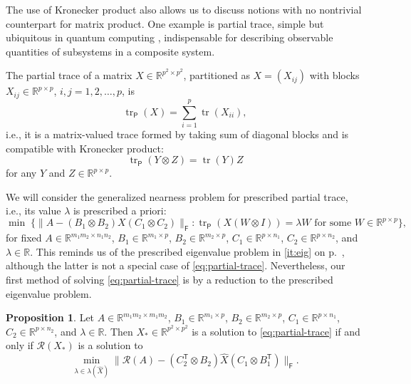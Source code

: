 \documentclass[11pt,reqno]{amsart}
\newcommand{\tp}{{\scriptscriptstyle\mathsf{T}}}
\newcommand{\F}{{\scriptscriptstyle\mathsf{F}}}
\newcommand{\Par}{{\scriptscriptstyle\mathsf{P}}}
\DeclareMathOperator{\tr}{tr}
\theoremstyle{definition}
\newtheorem{proposition}[theorem]{Proposition}
\numberwithin{equation}{section}
\newcommand{\R}{\mathbb{R}}
\begin{document}
The use of Kronecker product also allows us to discuss notions with no nontrivial counterpart for matrix product. One example is partial trace, simple but ubiquitous in quantum computing \cite{NielsenChuang}, indispensable for describing observable quantities of subsystems in a composite system.

The partial trace of a matrix $X \in \R^{p^2 \times p^2}$, partitioned as $X = (X_{ij})$ with blocks $X_{ij} \in \R^{p \times p}$, $i,j = 1,2,\dots,p$, is
\[
\tr_\Par(X) = \sum_{i=1}^{p} \tr(X_{ii}),
\]
i.e., it is a matrix-valued trace formed by taking sum of diagonal blocks and is compatible with Kronecker product:
\[
\tr_\Par(Y \otimes Z) = \tr(Y)Z
\]
for any $Y$ and $Z \in \R^{p \times p}$.

We will consider the generalized  nearness problem for prescribed partial trace, i.e., its value $\lambda$ is prescribed a priori:
\begin{equation}\label{eq:partial-trace}
    \min \; \{\lVert  A- (B_1 \otimes B_2)X(C_1 \otimes C_2)  \rVert_\F: \tr_\Par(X(W \otimes I)) = \lambda W \text{ for some } W \in \R^{p \times p}\},
\end{equation}
for fixed $A \in \R^{m_1m_2\times n_1n_2}$, $B_1 \in \R^{m_1 \times p}$, $B_2 \in \R^{m_2 \times p}$, $C_1 \in \R^{p \times n_1}$, $C_2 \in \R^{p \times n_2}$, and $\lambda \in \R$. This reminds us of the prescribed eigenvalue problem in \ref{it:eig} on p.~\pageref{it:eig}, although the latter is not a special case of \eqref{eq:partial-trace}. Nevertheless, our first method of solving \eqref{eq:partial-trace} is by a reduction to the prescribed eigenvalue problem.

\begin{proposition}\label{prop:partial-trace}
Let $A \in \R^{m_1m_2\times m_1m_2}$, $B_1 \in \R^{m_1 \times p}$, $B_2 \in \R^{m_2 \times p}$, $C_1 \in \R^{p \times n_1}$, $C_2 \in \R^{p \times n_2}$, and $\lambda \in \R$. Then $X_* \in \R^{p^2 \times p^2}$ is a solution to \eqref{eq:partial-trace} if and only if $\mathcal{R}(X_*)$ is a solution to 
\begin{equation} \label{eq:partial-trace-eig}
    \min_{\lambda \in \lambda(\widehat{X})} \lVert \mathcal{R}(A)- (C_2^\tp \otimes B_2)\widehat{X}(C_1 \otimes B_1^\tp) \rVert_\F.
\end{equation}
\end{proposition}
\end{document}
